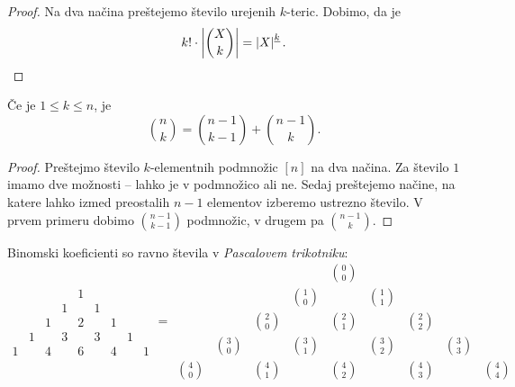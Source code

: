 \begin{proof}
Na dva načina preštejemo število urejenih $k$-teric. Dobimo, da je
\[
k! \cdot \left\lvert \binom{X}{k}\right\rvert = \left\lvert X\right\rvert^{\underline{k}}. \qedhere
\]
\end{proof}

\begin{trditev}
Če je $1 \leq k \leq n$, je
\[
\binom{n}{k} = \binom{n-1}{k-1} + \binom{n-1}{k}.
\]
\end{trditev}

\begin{proof}
Preštejmo število $k$-elementnih podmnožic $[n]$ na dva načina. Za
število $1$ imamo dve možnosti -- lahko je v podmnožico ali ne.
Sedaj preštejemo načine, na katere lahko izmed preostalih $n-1$
elementov izberemo ustrezno število. V prvem primeru dobimo
$\binom{n-1}{k-1}$ podmnožic, v drugem pa $\binom{n-1}{k}$.
\end{proof}

\begin{posledica}
Binomski koeficienti so ravno števila v
\emph{Pascalovem trikotniku}:
\[
\begin{array}{ccccccccccc}
  &   &   &    & 1 &    &   &   &   \\
  &   &   & 1  &   & 1  &   &   &   \\
  &   & 1 &    & 2 &    & 1 &   &   \\
  & 1 &   & 3  &   & 3  &   & 1 &   \\
1 &   & 4 &    & 6 &    & 4 &   & 1
\end{array}
=
\begin{array}{ccccccccccc}
             &              &              &              & \binom{0}{0} &              &              &              &              \\
             &              &              & \binom{1}{0} &              & \binom{1}{1} &              &              &              \\
             &              & \binom{2}{0} &              & \binom{2}{1} &              & \binom{2}{2} &              &              \\
             & \binom{3}{0} &              & \binom{3}{1} &              & \binom{3}{2} &              & \binom{3}{3} &              \\
\binom{4}{0} &              & \binom{4}{1} &              & \binom{4}{2} &              & \binom{4}{3} &              & \binom{4}{4}
\end{array}
\]
\end{posledica}

